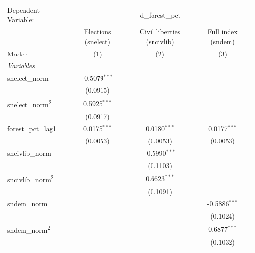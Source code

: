 
\begingroup
\centering
\begin{tabular}{lccc}
   \tabularnewline \midrule \midrule
   Dependent Variable: & \multicolumn{3}{c}{d\_forest\_pct}\\
                                       & Elections (snelect) & Civil liberties (sncivlib) & Full index (sndem) \\   
   Model:                              & (1)                 & (2)                        & (3)\\  
   \midrule
   \emph{Variables}\\
   snelect\_norm                       & -0.5079$^{***}$     &                            &   \\   
                                       & (0.0915)            &                            &   \\   
   snelect\_norm\textsuperscript{2}    & 0.5925$^{***}$      &                            &   \\   
                                       & (0.0917)            &                            &   \\   
   forest\_pct\_lag1                   & 0.0175$^{***}$      & 0.0180$^{***}$             & 0.0177$^{***}$\\   
                                       & (0.0053)            & (0.0053)                   & (0.0053)\\   
   sncivlib\_norm                      &                     & -0.5990$^{***}$            &   \\   
                                       &                     & (0.1103)                   &   \\   
   sncivlib\_norm\textsuperscript{2}   &                     & 0.6623$^{***}$             &   \\   
                                       &                     & (0.1091)                   &   \\   
   sndem\_norm                         &                     &                            & -0.5886$^{***}$\\   
                                       &                     &                            & (0.1024)\\   
   sndem\_norm\textsuperscript{2}      &                     &                            & 0.6877$^{***}$\\   
                                       &                     &                            & (0.1032)\\   

\end{tabular}

